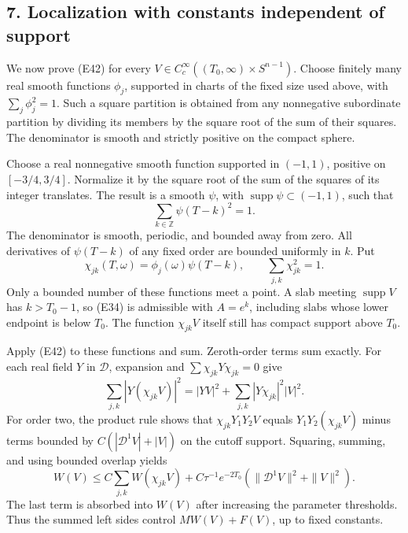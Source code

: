 \documentclass[
  11pt,
]{article}
\begin{document}
\subsection{7. Localization with constants independent of
support}\label{localization-with-constants-independent-of-support}

We now prove (E42) for every
\(V\in C_c^\infty((T_0,\infty)\times S^{n-1})\). Choose finitely many
real smooth functions \(\phi_j\), supported in charts of the fixed size
used above, with \(\sum_j\phi_j^2=1\). Such a square partition is
obtained from any nonnegative subordinate partition by dividing its
members by the square root of the sum of their squares. The denominator
is smooth and strictly positive on the compact sphere.

Choose a real nonnegative smooth function supported in \((-1,1)\),
positive on \([-3/4,3/4]\). Normalize it by the square root of the sum
of the squares of its integer translates. The result is a smooth
\(\psi\), with \(\operatorname{supp}\psi\subset(-1,1)\), such that \[
 \sum_{k\in\mathbb Z}\psi(T-k)^2=1.
\] The denominator is smooth, periodic, and bounded away from zero. All
derivatives of \(\psi(T-k)\) of any fixed order are bounded uniformly in
\(k\). Put \[
 \chi_{jk}(T,\omega)=\phi_j(\omega)\psi(T-k),\qquad
                            \sum_{j,k}\chi_{jk}^2=1.             \tag{E43}
\] Only a bounded number of these functions meet a point. A slab meeting
\(\operatorname{supp}V\) has \(k>T_0-1\), so (E34) is admissible with
\(A=e^k\), including slabs whose lower endpoint is below \(T_0\). The
function \(\chi_{jk}V\) itself still has compact support above \(T_0\).

Apply (E42) to these functions and sum. Zeroth-order terms sum exactly.
For each real field \(Y\) in \(\mathcal D\), expansion and
\(\sum\chi_{jk}Y\chi_{jk}=0\) give \[
 \sum_{j,k}|Y(\chi_{jk}V)|^2
       =|YV|^2+\sum_{j,k}|Y\chi_{jk}|^2|V|^2.                  \tag{E44}
\] For order two, the product rule shows that \(\chi_{jk}Y_1Y_2V\)
equals \(Y_1Y_2(\chi_{jk}V)\) minus terms bounded by
\(C(|\mathcal D^1V|+|V|)\) on the cutoff support. Squaring, summing, and
using bounded overlap yields \[
 W(V)\leq C\sum_{j,k}W(\chi_{jk}V)
       +C\tau^{-1}e^{-2T_0}
                         (\|\mathcal D^1V\|^2+\|V\|^2).
\] The last term is absorbed into \(W(V)\) after increasing the
parameter thresholds. Thus the summed left sides control \(MW(V)+F(V)\),
up to fixed constants.
\end{document}
